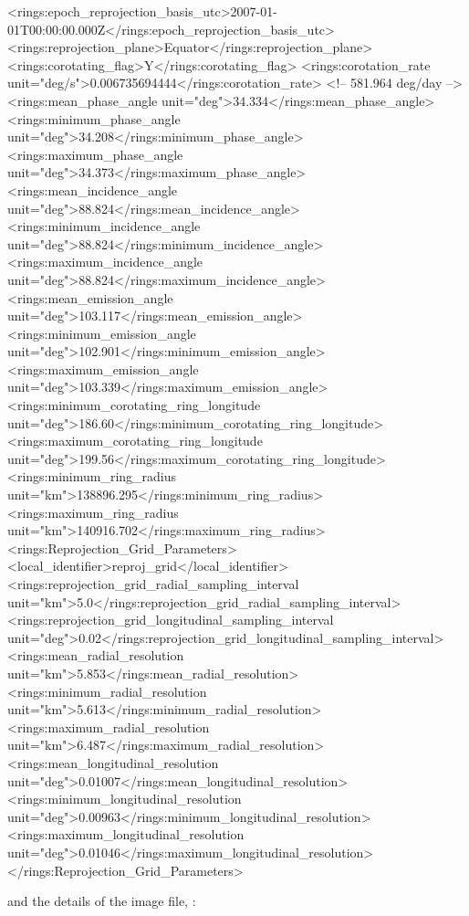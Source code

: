 \begin{CodeBlock}[fontsize=\scriptsize]
<rings:epoch_reprojection_basis_utc>2007-01-01T00:00:00.000Z</rings:epoch_reprojection_basis_utc>
<rings:reprojection_plane>Equator</rings:reprojection_plane>
<rings:corotating_flag>Y</rings:corotating_flag>
<rings:corotation_rate unit="deg/s">0.006735694444</rings:corotation_rate> <!-- 581.964 deg/day -->
<rings:mean_phase_angle unit="deg">34.334</rings:mean_phase_angle>
<rings:minimum_phase_angle unit="deg">34.208</rings:minimum_phase_angle>
<rings:maximum_phase_angle unit="deg">34.373</rings:maximum_phase_angle>
<rings:mean_incidence_angle unit="deg">88.824</rings:mean_incidence_angle>
<rings:minimum_incidence_angle unit="deg">88.824</rings:minimum_incidence_angle>
<rings:maximum_incidence_angle unit="deg">88.824</rings:maximum_incidence_angle>
<rings:mean_emission_angle unit="deg">103.117</rings:mean_emission_angle>
<rings:minimum_emission_angle unit="deg">102.901</rings:minimum_emission_angle>
<rings:maximum_emission_angle unit="deg">103.339</rings:maximum_emission_angle>
<rings:minimum_corotating_ring_longitude unit="deg">186.60</rings:minimum_corotating_ring_longitude>
<rings:maximum_corotating_ring_longitude unit="deg">199.56</rings:maximum_corotating_ring_longitude>
<rings:minimum_ring_radius unit="km">138896.295</rings:minimum_ring_radius>
<rings:maximum_ring_radius unit="km">140916.702</rings:maximum_ring_radius>
<rings:Reprojection_Grid_Parameters>
    <local_identifier>reproj_grid</local_identifier>
    <rings:reprojection_grid_radial_sampling_interval unit="km">5.0</rings:reprojection_grid_radial_sampling_interval>
    <rings:reprojection_grid_longitudinal_sampling_interval unit="deg">0.02</rings:reprojection_grid_longitudinal_sampling_interval>
    <rings:mean_radial_resolution unit="km">5.853</rings:mean_radial_resolution>
    <rings:minimum_radial_resolution unit="km">5.613</rings:minimum_radial_resolution>
    <rings:maximum_radial_resolution unit="km">6.487</rings:maximum_radial_resolution>
    <rings:mean_longitudinal_resolution unit="deg">0.01007</rings:mean_longitudinal_resolution>
    <rings:minimum_longitudinal_resolution unit="deg">0.00963</rings:minimum_longitudinal_resolution>
    <rings:maximum_longitudinal_resolution unit="deg">0.01046</rings:maximum_longitudinal_resolution>
</rings:Reprojection_Grid_Parameters>
\end{CodeBlock}

and the details of the image file, :

